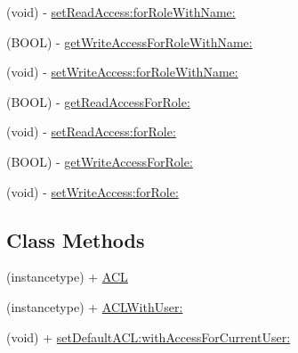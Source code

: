 \begin{DoxyCompactItemize}
\begin{DoxyCompactList}
 \end{DoxyCompactList}\item 
(void) -\/ \hyperlink{interface_p_f_a_c_l_afce7b83746fcc219f5a2234e92caaa54}{set\+Read\+Access\+:for\+Role\+With\+Name\+:}
\item 
(B\+O\+O\+L) -\/ \hyperlink{interface_p_f_a_c_l_a1a70132f12ee11f6448aa87dbeb343be}{get\+Write\+Access\+For\+Role\+With\+Name\+:}
\item 
(void) -\/ \hyperlink{interface_p_f_a_c_l_a51a2785e6cbb3ab0f701e3c9c6dbd52f}{set\+Write\+Access\+:for\+Role\+With\+Name\+:}
\item 
(B\+O\+O\+L) -\/ \hyperlink{interface_p_f_a_c_l_ad7ad4281e2732a41fc338260ff41f102}{get\+Read\+Access\+For\+Role\+:}
\item 
(void) -\/ \hyperlink{interface_p_f_a_c_l_a6e62c27f78da1ec247153f5cd699db70}{set\+Read\+Access\+:for\+Role\+:}
\item 
(B\+O\+O\+L) -\/ \hyperlink{interface_p_f_a_c_l_a3431e4aa71e5ae78e3b1e7bc891cab91}{get\+Write\+Access\+For\+Role\+:}
\item 
(void) -\/ \hyperlink{interface_p_f_a_c_l_a0a8573ce2356fa68e65de211a4ec96d4}{set\+Write\+Access\+:for\+Role\+:}
\end{DoxyCompactItemize}
\subsection*{Class Methods}
\begin{DoxyCompactItemize}
\item 
(instancetype) + \hyperlink{interface_p_f_a_c_l_ae8afffc8743a279e3fd873321ddbbd39}{A\+C\+L}
\begin{DoxyCompactList}\small\item\em 

 \end{DoxyCompactList}\item 
(instancetype) + \hyperlink{interface_p_f_a_c_l_a55e9181d765d3e203728ec942ed7b3df}{A\+C\+L\+With\+User\+:}
\item 
(void) + \hyperlink{interface_p_f_a_c_l_abdc0943560d16d6800cd58ea471d4e36}{set\+Default\+A\+C\+L\+:with\+Access\+For\+Current\+User\+:}
\begin{DoxyCompactList}\small\item\em 

 \end{DoxyCompactList}\end{DoxyCompactItemize}
